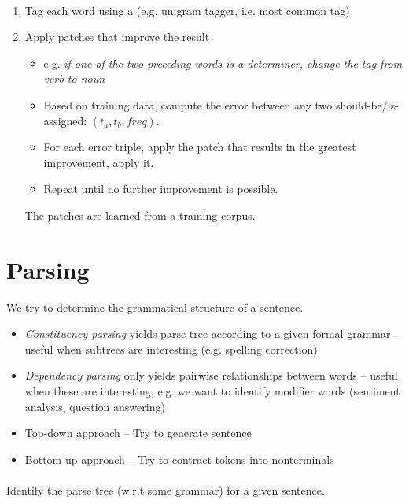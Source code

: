\documentclass[10pt,twocolumn]{article}
\begin{document}
\paragraph{ }
\begin{enumerate}
\item Tag each word using a  (e.g. unigram tagger, i.e.
  most common tag)
\item Apply patches that improve the result
  \begin{itemize}
  \item e.g. \textit{if one of the two preceding words is a determiner, change
      the tag from verb to noun}
  \item Based on training data, compute the error between any two
    should-be/is-assigned: $(t_a, t_b, \mathit{freq})$.
  \item For each error triple, apply the patch that results in the greatest
    improvement, apply it.
  \item Repeat until no further improvement is possible.
  \end{itemize}
  The patches are learned from a training corpus.
\end{enumerate}



\section{Parsing}

We try to determine the grammatical structure of a sentence.
\begin{itemize}
\item \textit{Constituency parsing} yields parse tree according to a given
  formal grammar -- useful when subtrees are interesting (e.g. spelling correction)
\item \textit{Dependency parsing} only yields pairwise relationships between
  words -- useful when these are interesting, e.g. we want to identify modifier
  words (sentiment analysis, question answering)
\end{itemize}

\begin{itemize}
\item Top-down approach -- Try to generate sentence
\item Bottom-up approach -- Try to contract tokens into nonterminals
\end{itemize}



\paragraph{} Identify the parse tree (w.r.t some grammar)
for a given sentence. 
\end{document}
